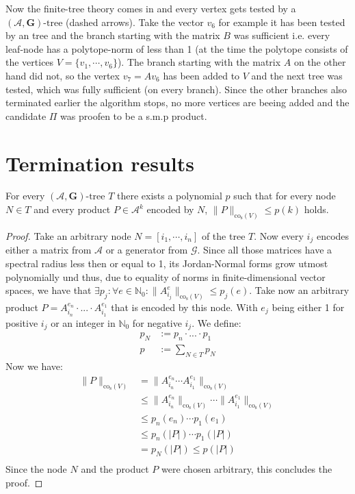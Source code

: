 Now the finite-tree theory comes in and every vertex gets tested by a $(\mathcal{A},\mathbf{G})\text{-tree}$ (dashed arrows). Take the vector $v_6$ for example it has been tested by an tree and the branch starting with the matrix $B$ was sufficient i.e. every leaf-node has a polytope-norm of less than 1 (at the time the polytope consists of the vertices $V = \{v_1, \cdots, v_6\}$). The branch starting with the matrix $A$ on the other hand did not, so the vertex $v_7 = Av_6$ has been added to $V$ and the next tree was tested, which was fully sufficient (on every branch). Since the other branches also terminated earlier the algorithm stops, no more vertices are beeing added and the candidate $\Pi$ was proofen to be a s.m.p product. 

\section{Termination results}

\begin{lemma}
  \label{lem:poly}
  For every $(\mathcal{A},\mathbf{G})\text{-tree } T$ there exists a polynomial $p$ such that for every node $N \in T$ and every product $P \in \mathcal{A}^k$ encoded by $N$, $\lVert P \rVert _{\text{co}_{\text{s}}(V)} \le p(k)$ holds.
\end{lemma}

\begin{proof}
  Take an arbitrary node $N = [i_1, \cdots, i_n]$ of the tree $T$. 
  Now every $i_j$ encodes either a matrix from $\mathcal{A}$ or a generator from $\mathcal{G}$. 
  Since all those matrices have a spectral radius less then or equal to 1, its Jordan-Normal forms grow utmost polynomially und thus, due to equality of norms in finite-dimensional vector spaces, we have that $ \exists p_j: \forall e \in \mathbb{N}_0: \lVert A_{i_j}^{e} \rVert _{\text{co}_{\text{s}}(V)} \le p_j(e)$.
  Take now an arbitrary product $P = A_{i_n}^{e_{n}}\cdot...\cdot A_{i_1}^{e_{1}}$ that is encoded by this node. 
  With $e_j$ being either 1 for positive $i_j$ or an integer in $\mathbb{N}_0$ for negative $i_j$.
  We define: 
  $$
  \begin{aligned}
  p_N & := p_{n} \cdot ... \cdot p_{1} \\
  p & := \sum \limits_{N \in T} p_N
  \end{aligned}
  $$
  Now we have: 
  $$
  \begin{aligned}
  \lVert P \rVert _{\text{co}_{\text{s}}(V)} & = \lVert A_{i_n}^{e_{n}} \cdots A_{i_1}^{e_{1}} \rVert _{\text{co}_{\text{s}}(V)} \\
  & \leq \lVert A_{i_n}^{e_{n}} \rVert _{\text{co}_{\text{s}}(V)} \cdots \lVert A_{i_1}^{e_{1}} \rVert _{\text{co}_{\text{s}}(V)} \\
  & \leq p_{n}(e_n) \cdots p_{1}(e_1) \\
  & \leq p_{n}(\lvert P \rvert) \cdots p_{1}(\lvert P \rvert) \\
  & = p_N(\lvert P \rvert) \leq p(\lvert P \rvert) \\
  \end{aligned}
  $$
  Since the node $N$ and the product $P$ were chosen arbitrary, this concludes the proof. 
\end{proof}

